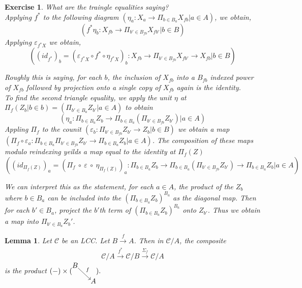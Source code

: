 \documentclass{article}
\theoremstyle{problemstyle}
\theoremstyle{problemstyle}
\theoremstyle{problemstyle}
\theoremstyle{problemstyle}
\newtheorem{lemma}{Lemma}
\theoremstyle{problemstyle}
\theoremstyle{problemstyle}
\theoremstyle{problemstyle}
\theoremstyle{problemstyle}
\newtheorem{exercise}{Exercise}
\begin{document}
\begin{exercise}
What are the traingle equalities saying?\\ 
\vspace{5mm} %
Applying $f^*$ to the following diagram $(\eta_a:X_a \rightarrow \Pi_{b \in B_a}X_{fb}|a \in A)$, we obtain, $$(f^*\eta_b:X_{fb} \rightarrow \Pi_{b'\in B_{fb}}X_{fb'}|b \in B)$$ Applying $\varepsilon_{f^*X}$ we obtain, $$((id_{f^*})_b = (\varepsilon_{f^*X} \circ f^* \circ \eta_{f^*X})_b:X_{fb} \rightarrow \Pi_{b'\in B_{fb}}X_{fb'} \rightarrow X_{fb}|b \in B)$$

Roughly this is saying, for each $b$, the inclusion of $X_{fb}$ into a $B_{fb}$ indexed power of $X_{fb}$ followed by projection onto a single copy of $X_{fb}$ again is the identity.\\
\vspace{5mm} %
To find the second triangle equality, we apply the unit $\eta$ at $\Pi_f(Z_b|b\in b) = (\Pi_{b' \in B_a}Z_{b'}|a \in A)$ to obtain $$(\eta_a:\Pi_{b \in B_a}Z_b \rightarrow \Pi_{b \in B_a}(\Pi_{b' \in B_{fb}}Z_{b'})|a \in A)$$
Appling $\Pi_f$ to the counit $(\varepsilon_b:\Pi_{b' \in B_{fb}}Z_{b'}\rightarrow Z_b|b \in B)$ we obtain a map $(\Pi_f \circ \varepsilon_a:\Pi_{b\in B_a}{\Pi_{b' \in B_{fb}}Z_{b'}}\rightarrow \Pi_{b \in B_a}Z_b|a \in A)$. The composition of these maps modulo reindexing yeilds a map equal to the identity at $\Pi_f(Z)$ $$((id_{\Pi_f(Z)})_a = (\Pi_f \ \circ \ \varepsilon \ \circ \ \eta_{\Pi_f(Z)})_a:\Pi_{b \in B_a}Z_b \rightarrow \Pi_{b \in B_a}(\Pi_{b' \in B_{fb}}Z_{b'}) \rightarrow \Pi_{b \in B_a}Z_{b}|a \in A)$$

We can interpret this as the statement, for each $a \in A$, the product of the $Z_b$ where $b \in B_a$ can be included into the $(\Pi_{b\in B_a}Z_b)^{B_a}$ as the diagonal map. Then for each $b' \in B_a$, project the $b'$th term of $(\Pi_{b\in B_a}Z_b)^{B_a}$ onto $Z_{b'}$. Thus we obtain a map into $\Pi_{b' \in B_a}Z_b'$. 
\end{exercise}

\begin{lemma}
Let $\mathcal{C}$ be an LCC. Let  $B \xrightarrow[]{f} A$.  Then in $\mathcal{C}/A$, the composite
$$\mathcal{C}/A\xrightarrow[]{f^*} \mathcal{C}/B \xrightarrow[]{\Sigma_f} \mathcal{C}/A$$
is the product $(-)\times(\begin{tikzcd}[cramped, sep=small] B \arrow[rd, "f", start anchor={[xshift=-.6ex, yshift= .7ex]},end anchor={[xshift=.7ex, yshift= -.7ex]}]  &  \\  &  A \end{tikzcd}).$
\end{lemma}
\end{document}

